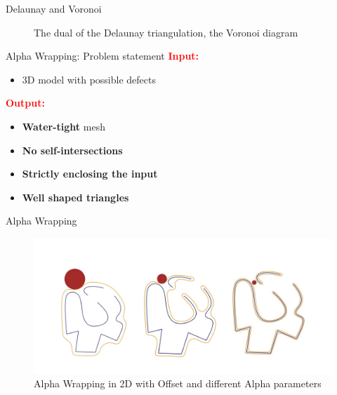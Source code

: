 \documentclass[10pt]{beamer}
\begin{document}
\begin{frame}{Delaunay and Voronoi}
\begin{figure}[H]
\begin{minipage}{0.49\textwidth}
        \caption{The dual of the Delaunay triangulation, the Voronoi diagram}
    \end{minipage}
  \end{figure}
\end{frame}

\begin{frame}{Alpha Wrapping: Problem statement}
  \Large
  \textcolor{red}{\textbf{Input:}}
    \begin{itemize}
    \item  3D model with possible defects
    \end{itemize}
    \textcolor{red}{\textbf{Output:} }
    \begin{itemize}
      \item \textbf{Water-tight} mesh
      \item \textbf{No self-intersections}
      \item \textbf{Strictly enclosing the input}
      \item \textbf{Well shaped triangles}
    \end{itemize}
\end{frame}


\begin{frame}{Alpha Wrapping}
  \begin{figure}[H]
    \centering
    \includegraphics[width=\textwidth]{images/alpha-wrapping_ball.jpg}
    \caption{Alpha Wrapping in 2D with Offset and different Alpha parameters}
\end{figure}
\end{frame}
\end{document}
